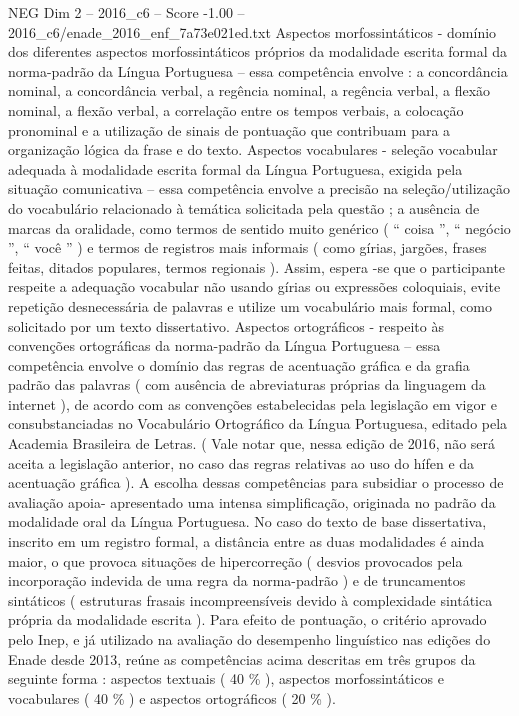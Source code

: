 \begin{textsample}{NEG Dim 2 – 2016\_c6 – Score -1.00 – 2016\_c6/enade\_2016\_enf\_7a73e021ed.txt}
Aspectos morfossintáticos - domínio dos diferentes aspectos morfossintáticos próprios da modalidade escrita formal da norma-padrão da Língua Portuguesa – essa competência envolve : a concordância nominal, a concordância verbal, a regência nominal, a regência verbal, a flexão nominal, a flexão verbal, a correlação entre os tempos verbais, a colocação pronominal e a utilização de sinais de pontuação que contribuam para a organização lógica da frase e do texto.
Aspectos vocabulares - seleção vocabular adequada à modalidade escrita formal da Língua Portuguesa, exigida pela situação comunicativa – essa competência envolve a precisão na seleção/utilização do vocabulário relacionado à temática solicitada pela questão ; a ausência de marcas da oralidade, como termos de sentido muito genérico ( “ coisa ”, “ negócio ”, “ você ” ) e termos de registros mais informais ( como gírias, jargões, frases feitas, ditados populares, termos regionais ).
Assim, espera -se que o participante respeite a adequação vocabular não usando gírias ou expressões coloquiais, evite repetição desnecessária de palavras e utilize um vocabulário mais formal, como solicitado por um texto dissertativo.
Aspectos ortográficos - respeito às convenções ortográficas da norma-padrão da Língua Portuguesa – essa competência envolve o domínio das regras de acentuação gráfica e da grafia padrão das palavras ( com ausência de abreviaturas próprias da linguagem da internet ), de acordo com as convenções estabelecidas pela legislação em vigor e consubstanciadas no Vocabulário Ortográfico da Língua Portuguesa, editado pela Academia Brasileira de Letras. ( Vale notar que, nessa edição de 2016, não será aceita a legislação anterior, no caso das regras relativas ao uso do hífen e da acentuação gráfica ).
A escolha dessas competências para subsidiar o processo de avaliação apoia- apresentado uma intensa simplificação, originada no padrão da modalidade oral da Língua Portuguesa.
No caso do texto de base dissertativa, inscrito em um registro formal, a distância entre as duas modalidades é ainda maior, o que provoca situações de hipercorreção ( desvios provocados pela incorporação indevida de uma regra da norma-padrão ) e de truncamentos sintáticos ( estruturas frasais incompreensíveis devido à complexidade sintática própria da modalidade escrita ).
Para efeito de pontuação, o critério aprovado pelo Inep, e já utilizado na avaliação do desempenho linguístico nas edições do Enade desde 2013, reúne as competências acima descritas em três grupos da seguinte forma : aspectos textuais ( 40 \% ), aspectos morfossintáticos e vocabulares ( 40 \% ) e aspectos ortográficos ( 20 \% ).

\end{textsample}
